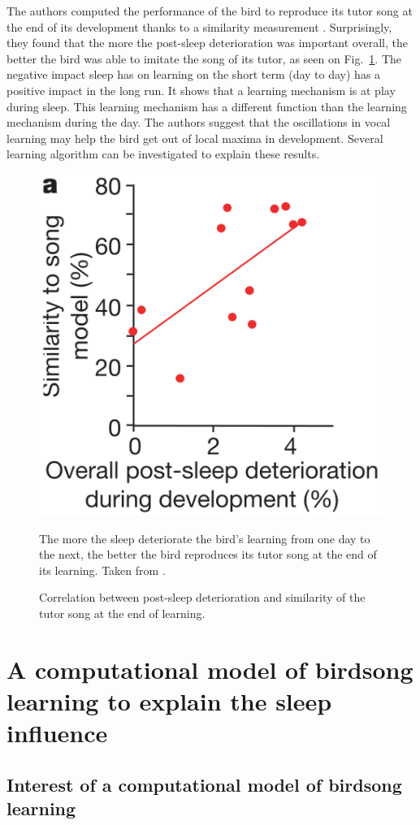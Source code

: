 \documentclass{report}
\begin{document}
The authors computed the performance of the bird to reproduce its tutor song at
the end of its development thanks to a similarity measurement
\parencite[][developped in
section~\ref{measures}]{tchernichovski_procedure_2000}. Surprisingly, they found
that the more the post-sleep deterioration was important overall, the better the
bird was able to imitate the song of its tutor, as seen on
Fig.~\ref{der_sim_post_det}. The negative impact sleep has on learning on the
short term (day to day) has a positive impact in the long run. It shows that a
learning mechanism is at play during sleep. This learning mechanism has a
different function than the learning mechanism during the day. The authors
suggest that the oscillations in vocal learning may help the bird get out of
local maxima in development. Several learning algorithm can be investigated to
explain these results.

\begin{figure}[htpb]
  {\center
  \includegraphics[width=0.3\linewidth]{media/cor_deterioration_sim}
  \caption{Correlation between post-sleep deterioration and similarity of the
  tutor song at the end of learning. \label{der_sim_post_det}}}
  \small
  The more the sleep deteriorate the bird's learning from one day to the next, the better the bird reproduces its tutor song at the end of its learning. Taken from \textcite{deregnaucourt_how_2005}.
\end{figure}


\section{A computational model of birdsong learning to explain the sleep
influence}
\label{a-computational-model-of-birdsong-learning-to-explain-the-sleep-influence}

\subsection{Interest of a computational model of birdsong learning}
\label{interest-of-a-computational-model-of-birdsong-learning}
\end{document}
